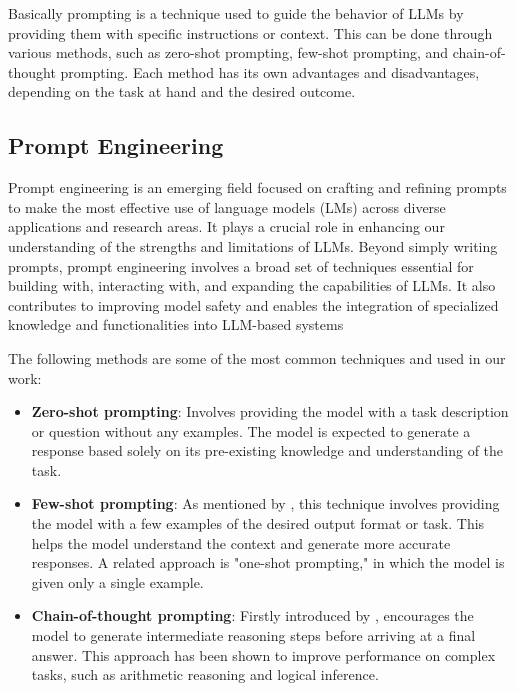 Basically prompting is a technique used to guide the behavior of LLMs by providing them with specific instructions or context. 
This can be done through various methods, such as zero-shot prompting, few-shot prompting, and chain-of-thought prompting. 
Each method has its own advantages and disadvantages, depending on the task at hand and the desired outcome.


\subsection{Prompt Engineering}

Prompt engineering is an emerging field focused on crafting and refining prompts to make the most effective use of language models (LMs) 
across diverse applications and research areas. It plays a crucial role in enhancing our understanding of the strengths and limitations of LLMs. 
Beyond simply writing prompts, prompt engineering involves a broad set of techniques essential for building with, interacting with, and expanding the capabilities of LLMs. 
It also contributes to improving model safety and enables the integration of specialized knowledge and functionalities into LLM-based systems

The following methods are some of the most common techniques and used in our work:

\begin{itemize}
    \item \textbf{Zero-shot prompting}: Involves providing the model with a task description or question without any examples. The model is expected to generate a response based solely on its pre-existing knowledge and understanding of the task.
    \item \textbf{Few-shot prompting}: As mentioned by \cite{gpt3Paper}, this technique involves providing the model with a few examples of the desired output format or task. This helps the model understand the context and generate more accurate responses. A related approach is "one-shot prompting," in which the model is given only a single example.
    \item \textbf{Chain-of-thought prompting}: Firstly introduced by \cite{chainofthought2023}, encourages the model to generate intermediate reasoning steps before arriving at a final answer. This approach has been shown to improve performance on complex tasks, such as arithmetic reasoning and logical inference.
\end{itemize}




